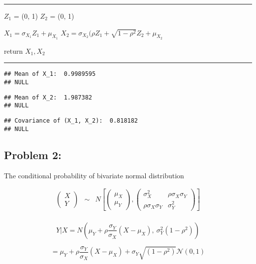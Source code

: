 \documentclass[
]{article}
\begin{document}
\begin{center}\rule{0.5\linewidth}{0.5pt}\end{center}

\(Z_1\) = (0, 1) \(Z_2\) = (0, 1)

\(X_1 = \sigma_{X_1} Z_1 + \mu_{X_1}\)
\(X_2 = \sigma_{X_2} (\rho Z_1 + \sqrt{1 - \rho^2} Z_2 + \mu_{X_2}\)

return \(X_1, X_2\)

\begin{center}\rule{0.5\linewidth}{0.5pt}\end{center}

\begin{verbatim}
## Mean of X_1:  0.9989595  
## NULL
\end{verbatim}

\begin{verbatim}
## Mean of X_2:  1.987382  
## NULL
\end{verbatim}

\begin{verbatim}
## Covariance of (X_1, X_2):  0.818182  
## NULL
\end{verbatim}

\hypertarget{problem-2}{%
\subsection{Problem 2:}\label{problem-2}}

The conditional probability of bivariate normal distribution

\[
\begin{eqnarray*} \begin{pmatrix} X\\ Y \end{pmatrix} & \sim & N\left[\left(\begin{array}{c} \mu_X\\ \mu_Y \end{array}\right),\left(\begin{array}{ccc} \sigma_X^2 & \rho \sigma_X \sigma_Y\\ \rho \sigma_X \sigma_Y & \sigma_Y^2 \end{array}\right)\right]\\ \end{eqnarray*}
\]

\[
Y|X = N\left(\mu_Y+\rho \frac{\sigma_Y}{\sigma_X}(X-\mu_X),\ \sigma^2_Y(1-\rho^2)\right)
\]

\[
= \mu_Y+\rho \frac{\sigma_Y}{\sigma_X}(X-\mu_X) + \sigma_Y \sqrt{(1-\rho^2)} \mathcal{N}(0, 1)
\]
\end{document}
